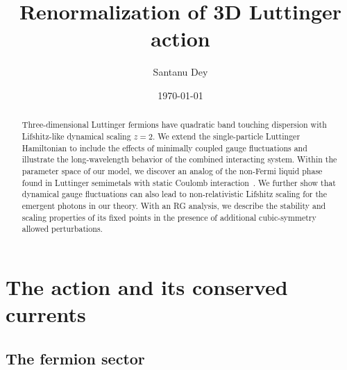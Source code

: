\documentclass[notitlepage,onecolumn,showpacs,aps,prb]{revtex4-2}
\begin{document}
\title{Renormalization of 3D Luttinger action}
\author{Santanu Dey}
\date{\today}
\begin{abstract}
Three-dimensional Luttinger fermions have quadratic band touching dispersion with
Lifshitz-like dynamical scaling $z = 2$. We extend the single-particle Luttinger
Hamiltonian to include the effects of minimally coupled gauge fluctuations and
illustrate the long-wavelength behavior of the combined interacting system. Within
the parameter space of our model, we discover an analog of the non-Fermi liquid phase
found in Luttinger semimetals with static Coulomb interaction~\cite{moon13}. We further
show that dynamical gauge fluctuations can also lead to non-relativistic Lifshitz
scaling for the emergent photons in our theory. With an RG analysis, we describe the
stability and scaling properties of its fixed points in the presence of additional
cubic-symmetry allowed perturbations.
\end{abstract}

\maketitle

\section{The action and its conserved currents}

\subsection{The fermion sector}
\end{document}
